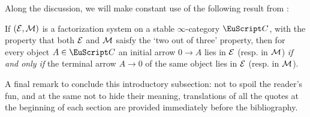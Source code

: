 {Along the discussion, we will make constant use of the following result from \cite{Fiorenza2014}:%
\begin{lemma*}
If $(\mathcal{E},\mathcal{M})$ is a factorization system on a stable $\infty$-category $\C$, with the property that both $\mathcal{E}$ and $\mathcal{M}$ saisfy the `two out of three' property, then for every object $A\in\C$ an initial arrow $0\to A$ lies in $\mathcal{E}$ (resp. in $\mathcal{M}$) \emph{if and only if} the terminal arrow $A\to 0$ of the same object lies in $\mathcal{E}$ (resp. in $\mathcal{M}$).
\end{lemma*}
A final remark to conclude this introductory subsection: not to spoil the reader's fun, and at the same not to hide their meaning, translations of all the quotes at the beginning of each section are provided immediately before the bibliography.
}